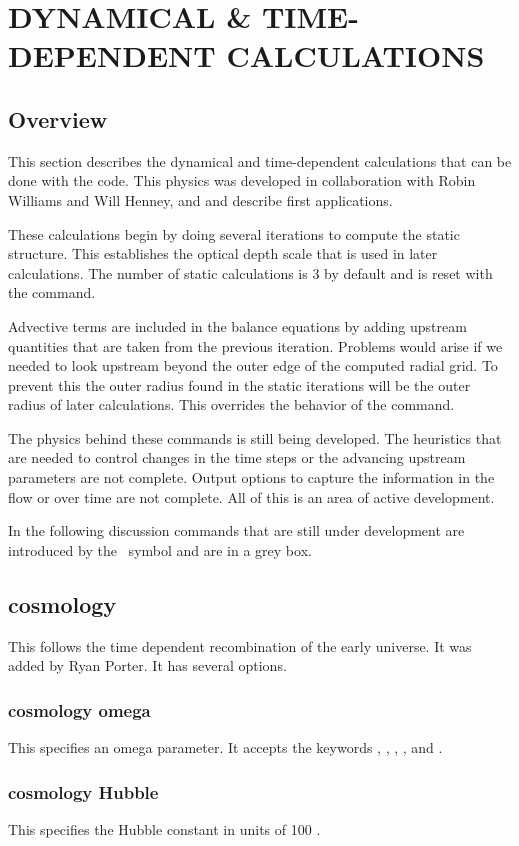 \chapter{DYNAMICAL \& TIME-DEPENDENT CALCULATIONS}
\label{sec:DynamicalTimeDependent}

\section{Overview}

This section describes the dynamical and time-dependent calculations
that can be done with the code.
This physics was developed in collaboration
with Robin Williams and Will Henney, and \citet{Henney2005}
and \citet{Henney2007} describe first applications.

These calculations begin by doing several iterations to compute the static
structure.
This establishes the optical depth scale that is used in later
calculations.
The number of static calculations is 3 by default and is
reset with the  command.

Advective terms are included in the balance equations by adding
upstream quantities that are taken from the previous iteration.
Problems would arise if we needed to look upstream beyond the
outer edge of the computed radial grid.
To prevent this the outer radius found in the static iterations will
be the outer radius of later calculations.
This overrides the behavior of the  command.

  The physics
behind these commands is still being developed.
The heuristics that are needed to control changes in the time steps or the
advancing upstream parameters are not complete.  Output options to capture
the information in the flow or over time are not complete.
All of this is an area of active development.

In the following discussion commands that are still under development are
introduced by the \experimental\ symbol and are in a grey box.

\begin{shaded}
\section{\experimental cosmology }
This follows the time dependent recombination of the early universe.
It was added by Ryan Porter.
It has several options.

\subsection{\experimental cosmology omega}
This specifies an omega parameter.
It accepts the keywords , ,
, , and .

\subsection{\experimental cosmology Hubble}
This specifies the Hubble constant in units of
100 \kmpspMpc.
\end{shaded}


